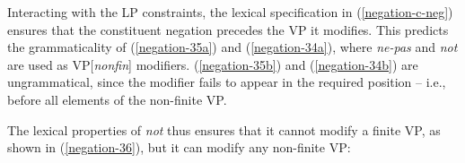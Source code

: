 \documentclass[output=paper
 	        ,biblatex
                ,babelshorthands
                ,newtxmath
                ,draftmode
                ,colorlinks, citecolor=brown
]{langscibook}
\begin{document}
\begin{exe}
\begin{xlist}
\begin{exe}
\begin{xlist}
\eal
{} \label{negation-35a}
 \label{negation-35b}
\zl

\eal
{} \label{negation-34a}
 \label{negation-34b}
\zl



%

\noindent
Interacting with the LP constraints, the lexical specification
in (\ref{negation-c-neg}) ensures that the constituent negation
precedes the VP it modifies. This predicts the
grammaticality of (\ref{negation-35a}) and (\ref{negation-34a}), where \textit{ne-pas} and \textit{not} are used as VP[\textit{nonfin}] modifiers.
(\ref{negation-35b}) and (\ref{negation-34b}) are ungrammatical, since
the modifier fails to appear in the required position -- i.e.,
before all elements of the non-finite VP.

\iffalse{}
The lexical properties of \textit{not} thus ensures that it cannot
modify a finite VP, as shown  in (\ref{negation-36}), but it can modify any
non-finite VP:

\eal\label{negation-36}
\zl


\end{xlist}
\end{exe}
\end{xlist}
\end{exe}
\end{document}
